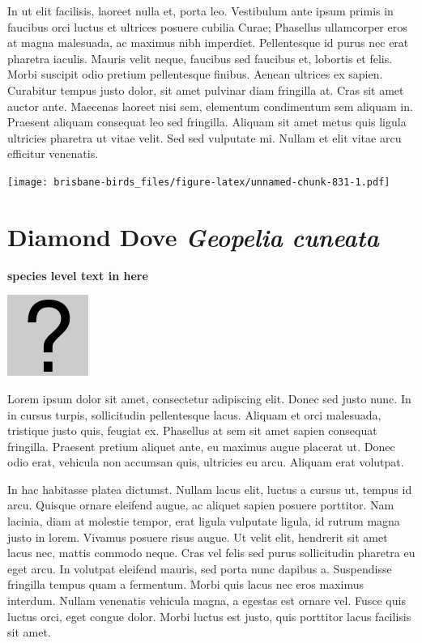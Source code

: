 \documentclass[]{book}
\let\origfigure\figure
\let\endorigfigure\endfigure
\renewenvironment{figure}[1][2] {
  \expandafter\origfigure\expandafter[H]
} {
  \endorigfigure
}
\begin{document}
In ut elit facilisis, laoreet nulla et, porta leo. Vestibulum ante ipsum
primis in faucibus orci luctus et ultrices posuere cubilia Curae;
Phasellus ullamcorper eros at magna malesuada, ac maximus nibh
imperdiet. Pellentesque id purus nec erat pharetra iaculis. Mauris velit
neque, faucibus sed faucibus et, lobortis et felis. Morbi suscipit odio
pretium pellentesque finibus. Aenean ultrices ex sapien. Curabitur
tempus justo dolor, sit amet pulvinar diam fringilla at. Cras sit amet
auctor ante. Maecenas laoreet nisi sem, elementum condimentum sem
aliquam in. Praesent aliquam consequat leo sed fringilla. Aliquam sit
amet metus quis ligula ultricies pharetra ut vitae velit. Sed sed
vulputate mi. Nullam et elit vitae arcu efficitur venenatis.

\begin{figure}
\centering
\texttt{[image: brisbane-birds\_files/figure-latex/unnamed-chunk-831-1.pdf]}
\caption{\label{fig:unnamed-chunk-831}insert figure caption}
\end{figure}

\section{\texorpdfstring{Diamond Dove \emph{Geopelia
cuneata}}{Diamond Dove Geopelia cuneata}}\label{diamond-dove-geopelia-cuneata}

\textbf{species level text in here}

\begin{figure}
\centering
\includegraphics{assets/missing.png}
\caption{No image for species}
\end{figure}

Lorem ipsum dolor sit amet, consectetur adipiscing elit. Donec sed justo
nunc. In in cursus turpis, sollicitudin pellentesque lacus. Aliquam et
orci malesuada, tristique justo quis, feugiat ex. Phasellus at sem sit
amet sapien consequat fringilla. Praesent pretium aliquet ante, eu
maximus augue placerat ut. Donec odio erat, vehicula non accumsan quis,
ultricies eu arcu. Aliquam erat volutpat.

In hac habitasse platea dictumst. Nullam lacus elit, luctus a cursus ut,
tempus id arcu. Quisque ornare eleifend augue, ac aliquet sapien posuere
porttitor. Nam lacinia, diam at molestie tempor, erat ligula vulputate
ligula, id rutrum magna justo in lorem. Vivamus posuere risus augue. Ut
velit elit, hendrerit sit amet lacus nec, mattis commodo neque. Cras vel
felis sed purus sollicitudin pharetra eu eget arcu. In volutpat eleifend
mauris, sed porta nunc dapibus a. Suspendisse fringilla tempus quam a
fermentum. Morbi quis lacus nec eros maximus interdum. Nullam venenatis
vehicula magna, a egestas est ornare vel. Fusce quis luctus orci, eget
congue dolor. Morbi luctus est justo, quis porttitor lacus facilisis sit
amet.
\end{document}
